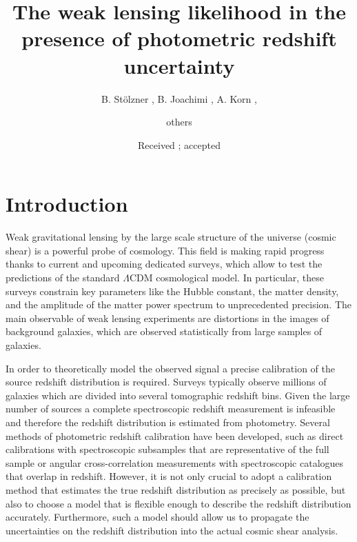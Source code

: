 \documentclass{aa}
\begin{document}
 

   \title{The weak lensing likelihood in the presence of photometric redshift uncertainty}


   \author{B. St\"olzner
             ,
             B. Joachimi
             ,
             A. Korn
             ,
          \and
          others
          }


   \date{Received ; accepted }



   \maketitle
%

\section{Introduction}
Weak gravitational lensing by the large scale structure of the universe (cosmic shear) is a powerful probe of cosmology. This field is making rapid progress thanks to current and upcoming dedicated surveys, which allow to test the predictions of the standard $\Lambda$CDM cosmological model. In particular, these surveys constrain key parameters like the Hubble constant, the matter density, and the amplitude of the matter power spectrum to unprecedented precision. The main observable of weak lensing experiments are distortions in the images of background galaxies, which are observed statistically from large samples of galaxies.

 In order to theoretically model the observed signal a precise calibration of the source redshift distribution is required. Surveys typically observe millions of galaxies which are divided into several tomographic redshift bins. Given the large number of sources a complete spectroscopic redshift measurement is infeasible and therefore the redshift distribution is estimated from photometry. Several methods of photometric redshift calibration have been developed, such as direct calibrations with spectroscopic subsamples that are representative of the full sample or angular cross-correlation measurements with spectroscopic catalogues that overlap in redshift. However, it is not only crucial to adopt a calibration method that estimates the true redshift distribution as precisely as possible, but also to choose a model that is flexible enough to describe the redshift distribution accurately. Furthermore, such a model should allow us to propagate the uncertainties on the redshift distribution into the actual cosmic shear analysis. 
 
\end{document}

